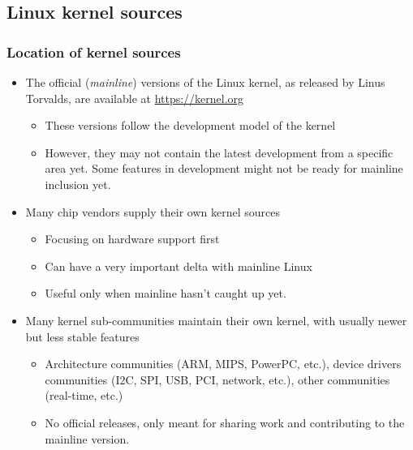 \subsection{Linux kernel sources}

\begin{frame}
  \frametitle{Location of kernel sources}
  \begin{itemize}
  \item The official ({\em mainline}) versions of the Linux kernel, as released by Linus
    Torvalds, are available at \url{https://kernel.org}
    \begin{itemize}
    \item These versions follow the development model of the kernel
    \item However, they may not contain the latest development from a
      specific area yet. Some features in development might not be
      ready for mainline inclusion yet.
    \end{itemize}
  \item Many chip vendors supply their own kernel sources
    \begin{itemize}
    \item Focusing on hardware support first
    \item Can have a very important delta with mainline Linux
    \item Useful only when mainline hasn't caught up yet.
    \end{itemize}
  \item Many kernel sub-communities maintain their own kernel, with
    usually newer but less stable features
    \begin{itemize}
    \item Architecture communities (ARM, MIPS, PowerPC, etc.), device
      drivers communities (I2C, SPI, USB, PCI, network, etc.), other
      communities (real-time, etc.)
    \item No official releases, only meant for sharing work and
      contributing to the mainline version.
    \end{itemize}
  \end{itemize}
\end{frame}

